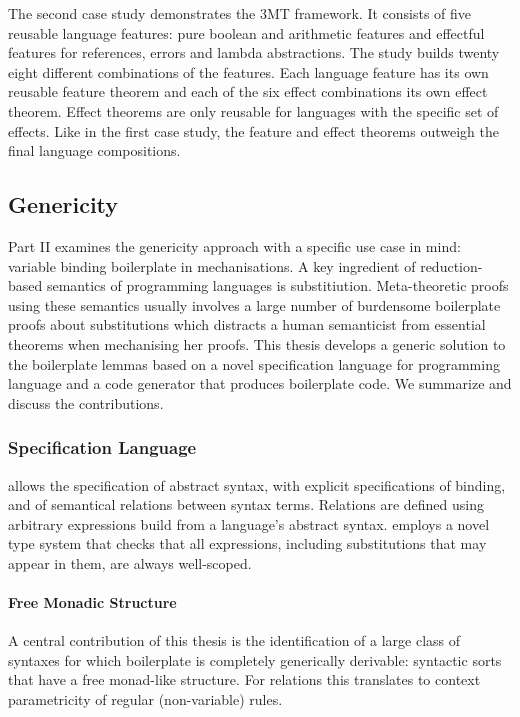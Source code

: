 The second case study demonstrates the 3MT framework. It consists of five
reusable language features: pure boolean and arithmetic features and effectful
features for references, errors and lambda abstractions. The study builds twenty
eight different combinations of the features. Each language feature has its own
reusable feature theorem and each of the six effect combinations its own effect
theorem. Effect theorems are only reusable for languages with the specific set
of effects. Like in the first case study, the feature and effect theorems
outweigh the final language compositions.



\subsection{Genericity}
Part II examines the genericity approach with a specific use case in mind:
variable binding boilerplate in mechanisations. A key ingredient of
reduction-based semantics of programming languages is substitiution.
Meta-theoretic proofs using these semantics usually involves a large number of
burdensome boilerplate proofs about substitutions which distracts a human
semanticist from essential theorems when mechanising her proofs. This thesis
develops a generic solution to the boilerplate lemmas based on a novel
specification language \Knot for programming language and a code generator
\Needle that produces boilerplate code. We summarize and discuss the
contributions.

\subsubsection{Specification Language}
\Knot allows the specification of abstract syntax, with explicit specifications
of binding, and of semantical relations between syntax terms. Relations are
defined using arbitrary expressions build from a language's abstract syntax.
\Knot employs a novel type system that checks that all expressions, including
substitutions that may appear in them, are always well-scoped.


\paragraph{Free Monadic Structure}
A central contribution of this thesis is the identification of a large class of
syntaxes for which boilerplate is completely generically derivable: syntactic
sorts that have a free monad-like structure. For relations this translates to
context parametricity of regular (non-variable) rules.

